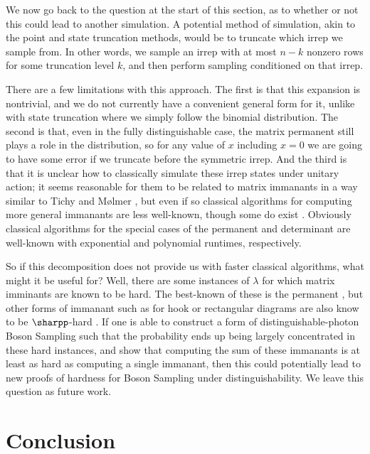 We now go back to the question at the start of this section, as to whether or not this could lead to another simulation. A potential method of simulation, akin to the point and state truncation methods, would be to truncate which irrep we sample from. In other words, we sample an irrep with at most $n-k$ nonzero rows for some truncation level $k$, and then perform sampling conditioned on that irrep.

There are a few limitations with this approach. The first is that this expansion is nontrivial, and we do not currently have a convenient general form for it, unlike with state truncation where we simply follow the binomial distribution. The second is that, even in the fully distinguishable case, the matrix permanent still plays a role in the distribution, so for any value of $x$ including $x=0$ we are going to have some error if we truncate before the symmetric irrep. And the third is that it is unclear how to classically simulate these irrep states under unitary action; it seems reasonable for them to be related to matrix immanants in a way similar to Tichy and M\o lmer \cite{tichy2017}, but even if so classical algorithms for computing more general immanants are less well-known, though some do exist \cite{hartmann1985, barvinok1990, burgisser2000, mertens2013}. Obviously classical algorithms for the special cases of the permanent and determinant are well-known with exponential \cite{glynn2010} and polynomial \cite{fisikopoulos2016} runtimes, respectively.

So if this decomposition does not provide us with faster classical algorithms, what might it be useful for? Well, there are some instances of $\lambda$ for which matrix imminants are known to be hard. The best-known of these is the permanent \cite{valiant1979, aaronson2011}, but other forms of immanant such as for hook or rectangular diagrams are also know to be $\sharpp$-hard \cite{burgisser2000immanants}. If one is able to construct a form of distinguishable-photon Boson Sampling such that the probability ends up being largely concentrated in these hard instances, and show that computing the sum of these immanants is at least as hard as computing a single immanant, then this could potentially lead to new proofs of hardness for Boson Sampling under distinguishability. We leave this question as future work.

\section{Conclusion}
\label{sec:conclusion}

